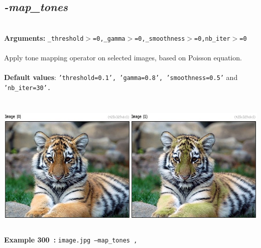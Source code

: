 \documentclass[a4paper,11pt,twoside]{book}
\begin{document}
\subsection{\emph{-map\_tones} }\vspace*{-0.5em}
~\\\textbf{Arguments: } 
{\small \texttt{\_threshold$>$=0,\_gamma$>$=0,\_smoothness$>$=0,nb\_iter$>$=0}}\\~\\
Apply tone mapping operator on selected images, based on Poisson equation.
~\\~\\\textbf{Default values}: {\small \texttt{'threshold=0.1', 'gamma=0.8', 'smoothness=0.5'} and \texttt{'nb\_iter=30'.}}
\begin{center}\includegraphics[keepaspectratio=true,height=7cm,width=\textwidth]{img/gmic_def300.jpg}\\
{\footnotesize \textbf{Example 300~:} \texttt{image.jpg --map\_tones ,}}
\end{center}
\end{document}
